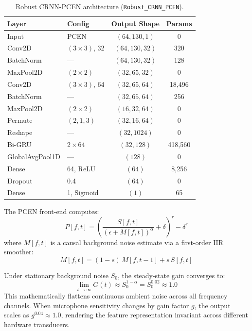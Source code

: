 \documentclass[conference]{IEEEtran}
\begin{document}
\begin{table}[!t]
\centering
\caption{Robust CRNN-PCEN architecture (\texttt{Robust\_CRNN\_PCEN}).}
\label{tab:arch_crnn}
\footnotesize
\begin{tabular}{llcc}
\toprule
\textbf{Layer} & \textbf{Config} & \textbf{Output Shape} & \textbf{Params} \\
\midrule
Input & PCEN & $(64, 130, 1)$ & 0 \\
Conv2D & $(3\!\times\!3)$, 32 & $(64, 130, 32)$ & 320 \\
BatchNorm & --- & $(64, 130, 32)$ & 128 \\
MaxPool2D & $(2\!\times\!2)$ & $(32, 65, 32)$ & 0 \\
Conv2D & $(3\!\times\!3)$, 64 & $(32, 65, 64)$ & 18{,}496 \\
BatchNorm & --- & $(32, 65, 64)$ & 256 \\
MaxPool2D & $(2\!\times\!2)$ & $(16, 32, 64)$ & 0 \\
Permute & $(2,1,3)$ & $(32, 16, 64)$ & 0 \\
Reshape & --- & $(32, 1024)$ & 0 \\
Bi-GRU & $2\!\times\!64$ & $(32, 128)$ & 418{,}560 \\
GlobalAvgPool1D & --- & $(128)$ & 0 \\
Dense & 64, ReLU & $(64)$ & 8{,}256 \\
Dropout & 0.4 & $(64)$ & 0 \\
Dense & 1, Sigmoid & $(1)$ & 65 \\
\bottomrule
\end{tabular}
\end{table}

The PCEN front-end computes:
\begin{equation}
    P[f,t] = \left( \frac{S[f,t]}{(\epsilon + M[f,t])^{\alpha}} + \delta \right)^{r} - \delta^{r}
    \label{eq:pcen}
\end{equation}
where $M[f,t]$ is a causal background noise estimate via a first-order IIR smoother:
\begin{equation}
    M[f,t] = (1 - s)\, M[f,t\!-\!1] + s\, S[f,t]
    \label{eq:iir}
\end{equation}

Under stationary background noise $S_0$, the steady-state gain converges to:
\begin{equation}
    \lim_{t \to \infty} G(t) \approx S_0^{1 - \alpha} = S_0^{0.02} \approx 1.0
    \label{eq:steady_state}
\end{equation}
This mathematically flattens continuous ambient noise across all frequency channels. When microphone sensitivity changes by gain factor $g$, the output scales as $g^{0.04} \approx 1.0$, rendering the feature representation invariant across different hardware transducers.
\end{document}
